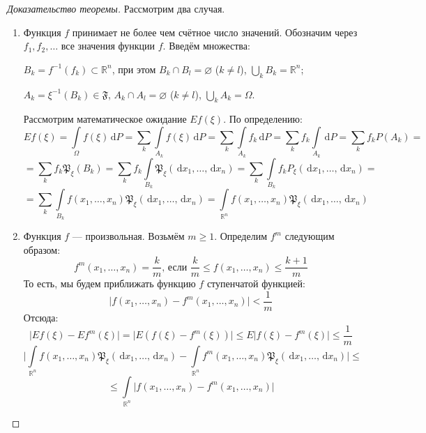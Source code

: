 \documentclass[11pt,openany,a4paper]{scrartcl}
\theoremstyle{plain}
\theoremstyle{definition}
\newcommand\mb{\mathbb}
\newcommand\real{\mb R}
\newcommand{\dif}{\, \mathrm d}
\begin{document}
\begin{proof}[Доказательство теоремы]
    Рассмотрим два случая.
    \begin{enumerate}
        \item Функция $f$ принимает не более чем счётное число значений. Обозначим
        через $f_1, f_2, \ldots$ все значения функции $f$. Введём множества:
        
        $B_k = f^{-1}(f_k) \subset \real^n$, при этом $B_k \cap B_l = \varnothing$
        ($k \neq l$), $\bigcup\limits_k B_k = \real^n$;
        
        $A_k = \xi^{-1}(B_k) \in \mathfrak F$, $A_k \cap A_l = \varnothing$
        ($k \neq l$), $\bigcup\limits_k A_k = \Omega$.
        
        Рассмотрим математическое ожидание $Ef(\xi)$. По определению:
        $$
        Ef(\xi) = \int\limits_\Omega f(\xi) \dif P =
        \sum\limits_k \int\limits_{A_k} f(\xi) \dif P =
        \sum\limits_k \int\limits_{A_k} f_k \dif P =
        \sum\limits_k f_k \int\limits_{A_k} \dif P = \sum\limits_k f_k P(A_k) =
        $$
        $$
        = \sum\limits_k f_k \mathfrak P_\xi (B_k) =
        \sum\limits_k f_k \int\limits_{B_k}
        \mathfrak P_\xi (\dif x_1, \ldots, \dif x_n) =
        \sum\limits_k \int\limits_{B_k} f_k P_\xi (\dif x_1, \ldots, \dif x_n) =
        $$
        $$
        = \sum\limits_k \int\limits_{B_k} f(x_1, \ldots, x_n)
        \mathfrak P_\xi (\dif x_1, \ldots, \dif x_n) =
        \int\limits_{\real^n} f(x_1, \ldots, x_n)
        \mathfrak P_\xi (\dif x_1, \ldots, \dif x_n)
        $$
        \item Функция $f$ — произвольная.
        Возьмём $m \geqslant 1$. Определим $f^m$ следующим образом:
        $$
        f^m(x_1, \ldots, x_n) = \frac{k}{m} \text{, если }
        \frac{k}{m} \leqslant f(x_1, \ldots, x_n) \leqslant \frac{k+1}{m}
        $$
        То есть, мы будем приближать функцию $f$ ступенчатой функцией:
        $$
        \big|f(x_1, \ldots, x_n) - f^m(x_1, \ldots, x_n)\big| < \frac{1}{m}
        $$
        Отсюда:
        $$
        \big|Ef(\xi) - Ef^m(\xi)\big| = \big|E(f(\xi) - f^m(\xi))\big| \leqslant
        E\big|f(\xi) - f^m(\xi)\big| \leqslant \frac{1}{m}
        $$
        $$
        \Bigg|\int\limits_{\real^n} f(x_1, \ldots, x_n)
        \mathfrak P_\xi(\dif x_1, \ldots, \dif x_n) -
        \int\limits_{\real^n} f^m(x_1, \ldots, x_n)
        \mathfrak P_\xi(\dif x_1, \ldots, \dif x_n)\Bigg| \leqslant
        $$
        $$
        \leqslant \int\limits_{\real^n}\big|f(x_1, \ldots, x_n)-f^m(x_1, \ldots, x_n)\big|
$$
\end{enumerate}
\end{proof}
\end{document}
